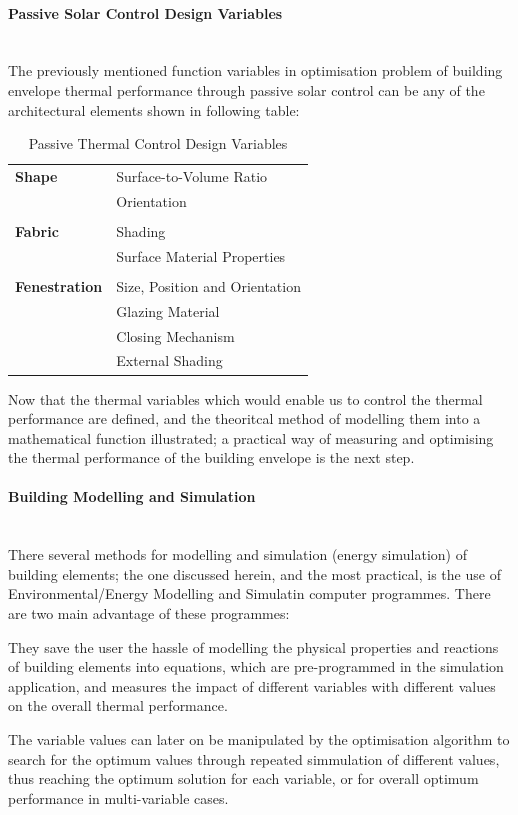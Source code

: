 \documentclass[11pt,a4paper,oneside]{article}
\begin{document}
\begin{multicols}{2}
\paragraph{Passive Solar Control Design Variables}\mbox{}\\

The previously mentioned function variables in optimisation problem of building envelope thermal performance through passive solar control can be any of the architectural elements shown in following table:

\begin{table}[H]
	\centering
	\begin{tabular}{l|l}
		\textbf{Shape}&Surface-to-Volume Ratio\\
		&Orientation\\
		&\\
		\textbf{Fabric}&Shading\\
		&Surface Material Properties\\
		&\\
		\textbf{Fenestration}&Size, Position and Orientation\\
		&Glazing Material\\
		&Closing Mechanism\\
		&External Shading\\
	\end{tabular}
	\caption{Passive Thermal Control Design Variables}
	\label{tab:ThermalDesignVariables}
\end{table}

Now that the thermal variables which would enable us to control the thermal performance are defined, and the theoritcal method of modelling them into a mathematical function illustrated; a practical way of measuring and optimising the thermal performance of the building envelope is the next step. 

\paragraph{Building Modelling and Simulation}\mbox{}\\

There several methods for modelling and simulation (energy simulation) of building elements; the one discussed herein, and the most practical, is the use of Environmental/Energy Modelling and Simulatin computer programmes. There are two main advantage of these programmes:
\begin{compactenum}
	\item They save the user the hassle of modelling the physical properties and reactions of building elements into equations, which are pre-programmed in the simulation application, and measures the impact of different variables with different values on the overall thermal performance.
	\item The variable values can later on be manipulated by the optimisation algorithm to search for the optimum values through repeated simmulation of different values, thus reaching the optimum solution for each variable, or for overall optimum performance in multi-variable cases.
\end{compactenum}





\end{multicols}
\end{document}
